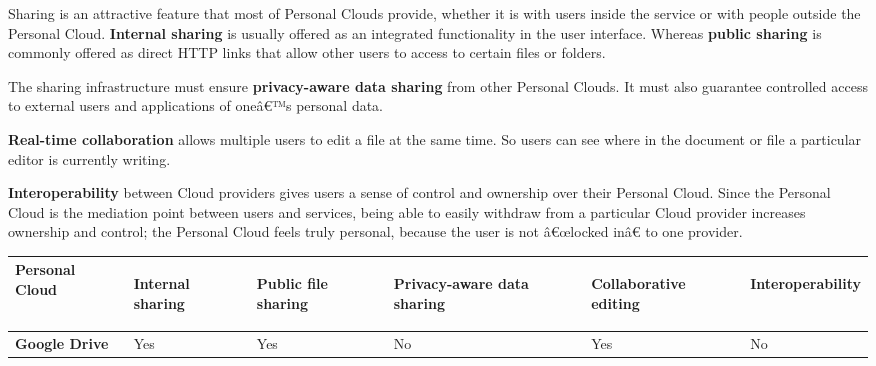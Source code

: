 {Sharing is an attractive feature that most of Personal Clouds provide, whether it is with users inside the service or with people outside the Personal Cloud. \textbf{Internal sharing} is usually offered as an integrated functionality in the user interface. Whereas \textbf{public sharing} is commonly offered as direct HTTP links that allow other users to access to certain files or folders.

The sharing infrastructure must ensure \textbf{privacy-aware data sharing} from other Personal Clouds. It must also guarantee controlled access to external users and applications of oneâ€™s personal data.

\textbf{Real-time collaboration} allows multiple users to edit a file at the same time. So users can see where in the document or file a particular editor is currently writing.

\textbf{Interoperability} between Cloud providers gives users a sense of control and ownership over their Personal Cloud. Since the Personal Cloud is the mediation point between users and services, being able to easily withdraw from a particular Cloud provider increases ownership and control; the Personal Cloud feels truly personal, because the user is not â€œlocked inâ€ to one provider.


{
\def\arraystretch{1.5}

\begin{table}
\begin{center}
    \begin{tabular}{ | p{3.3cm} | p{1.5cm} | p{1.5cm} | p{1.5cm} | p{1.5cm} | p{1.5cm} | }
    \hline
    \rowcolor[gray]{0.8}

	\textbf{Personal Cloud} &
	\begin{sideways}\textbf{Internal sharing}\end{sideways} &
	\begin{sideways}\textbf{Public file sharing}\end{sideways} &
	\begin{sideways}\textbf{Privacy-aware data sharing}\end{sideways} & 
	\begin{sideways}\textbf{Collaborative editing}\end{sideways} & 
	\begin{sideways}\textbf{Interoperability}\end{sideways} \\ \hline

	\textbf{Google Drive} &
	Yes &
	Yes &
	No &
	Yes &
	No \\ \hline


\end{tabular}
\end{center}
\end{table}}}
